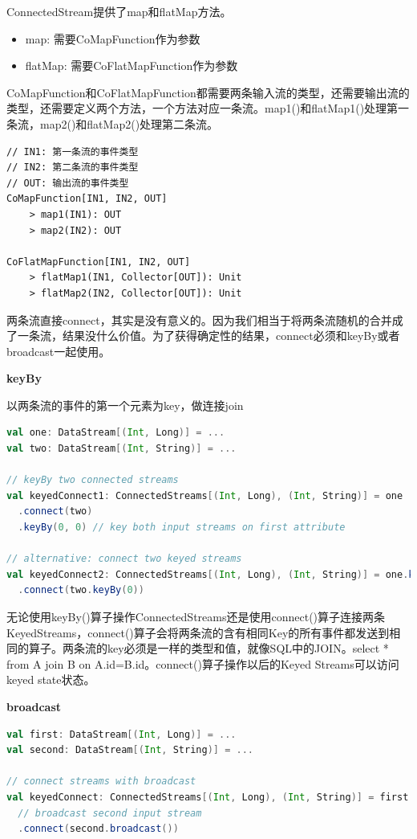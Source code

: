 \documentclass[oneside]{ctexbook}
\begin{document}
ConnectedStream提供了map和flatMap方法。

\begin{itemize}
\item map: 需要CoMapFunction作为参数
\item flatMap: 需要CoFlatMapFunction作为参数
\end{itemize}

CoMapFunction和CoFlatMapFunction都需要两条输入流的类型，还需要输出流的类型，还需要定义两个方法，一个方法对应一条流。map1()和flatMap1()处理第一条流，map2()和flatMap2()处理第二条流。

\begin{lstlisting}
// IN1: 第一条流的事件类型
// IN2: 第二条流的事件类型
// OUT: 输出流的事件类型
CoMapFunction[IN1, IN2, OUT]
    > map1(IN1): OUT
    > map2(IN2): OUT

CoFlatMapFunction[IN1, IN2, OUT]
    > flatMap1(IN1, Collector[OUT]): Unit
    > flatMap2(IN2, Collector[OUT]): Unit
\end{lstlisting}

两条流直接connect，其实是没有意义的。因为我们相当于将两条流随机的合并成了一条流，结果没什么价值。为了获得确定性的结果，connect必须和keyBy或者broadcast一起使用。

\textbf{keyBy}

以两条流的事件的第一个元素为key，做连接join

\begin{lstlisting}[language=scala, breaklines]
val one: DataStream[(Int, Long)] = ...
val two: DataStream[(Int, String)] = ...

// keyBy two connected streams
val keyedConnect1: ConnectedStreams[(Int, Long), (Int, String)] = one
  .connect(two)
  .keyBy(0, 0) // key both input streams on first attribute

// alternative: connect two keyed streams
val keyedConnect2: ConnectedStreams[(Int, Long), (Int, String)] = one.keyBy(0)
  .connect(two.keyBy(0))
\end{lstlisting}

无论使用keyBy()算子操作ConnectedStreams还是使用connect()算子连接两条KeyedStreams，connect()算子会将两条流的含有相同Key的所有事件都发送到相同的算子。两条流的key必须是一样的类型和值，就像SQL中的JOIN。select * from A join B on A.id=B.id。connect()算子操作以后的Keyed Streams可以访问keyed state状态。

\textbf{broadcast}

\begin{lstlisting}[language=scala, breaklines]
val first: DataStream[(Int, Long)] = ...
val second: DataStream[(Int, String)] = ...

// connect streams with broadcast
val keyedConnect: ConnectedStreams[(Int, Long), (Int, String)] = first
  // broadcast second input stream
  .connect(second.broadcast())
\end{lstlisting}
\end{document}
